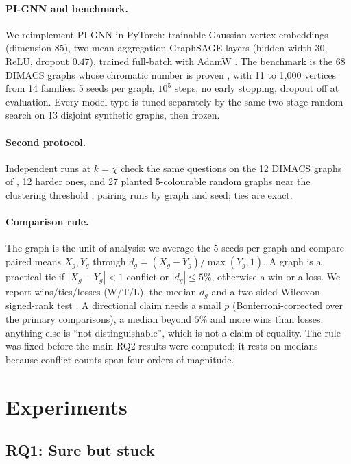 \documentclass[11pt]{article}
\begin{document}
\paragraph{PI-GNN and benchmark.} We reimplement PI-GNN in PyTorch: trainable
Gaussian vertex embeddings (dimension 85), two mean-aggregation GraphSAGE
layers (hidden width 30, ReLU, dropout $0.47$), trained full-batch with AdamW
\cite{loshchilov2019adamw}. The benchmark is the 68 DIMACS graphs whose
chromatic number is proven \cite{held2012safe,gualandi2012exact}, with 11 to
1{,}000 vertices from 14 families: 5 seeds per graph, $10^5$ steps, no early
stopping, dropout off at evaluation. Every model type is
tuned separately by the same two-stage random search on 13 disjoint synthetic
graphs, then frozen.

\paragraph{Second protocol.} Independent runs at $k=\chi$ check the same
questions on the 12 DIMACS graphs of \citet{schuetz2022colouring}, 12 harder
ones, and 27 planted 5-colourable random graphs near the clustering threshold
\citep{zdeborova2007phase}, pairing runs by graph and seed; ties are exact.

\paragraph{Comparison rule.} The graph is the unit of analysis: we average
the 5 seeds per graph and compare paired means $X_g,Y_g$ through
$d_g=(X_g-Y_g)/\max(Y_g,1)$. A graph is a practical tie if $|X_g-Y_g|<1$
conflict or $|d_g|\le 5\%$, otherwise a win or a loss. We report
wins/ties/losses (W/T/L), the median $d_g$ and a two-sided Wilcoxon
signed-rank test \cite{wilcoxon1945}. A directional claim needs a small $p$
(Bonferroni-corrected over the primary comparisons), a median beyond $5\%$
and more wins than losses; anything else is ``not
distinguishable'', which is not a claim of equality. The rule was fixed before
the main RQ2 results were computed; it rests on medians because conflict
counts span four orders of magnitude.

\section{Experiments}

\subsection{RQ1: Sure but stuck}
\end{document}
